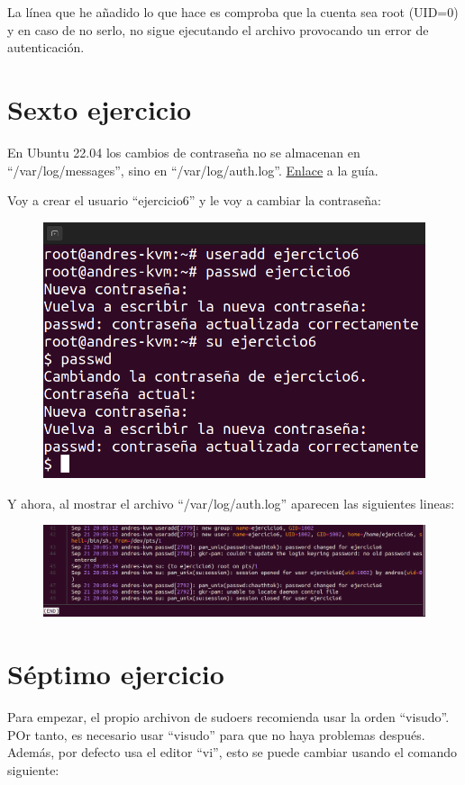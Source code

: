 \documentclass{article}
\begin{document}
La línea que he añadido lo que hace es comproba que la cuenta sea root (UID=0) y en caso de no serlo, no sigue ejecutando el archivo provocando un error de autenticación.


\section{Sexto ejercicio}
En Ubuntu 22.04 los cambios de contraseña no se almacenan en ``/var/log/messages'', sino en ``/var/log/auth.log''. \href{https://ubuntu.com/tutorials/viewing-and-monitoring-log-files#2-log-files-locations}{Enlace} a la guía.


Voy a crear el usuario ``ejercicio6'' y le voy a cambiar la contraseña:

\begin{figure}[H]
    \includegraphics[width=\textwidth]{imagenes/createejercicio6.png}
\end{figure}

Y ahora, al mostrar el archivo ``/var/log/auth.log'' aparecen las siguientes lineas:

\begin{figure}[H]
    \includegraphics[width=\textwidth]{imagenes/authcreateejercicio6.png}
\end{figure}

\section{Séptimo ejercicio}
Para empezar, el propio archivon de sudoers recomienda usar la orden ``visudo''. POr tanto, es necesario usar ``visudo'' para que no haya problemas después. Además, por defecto usa el editor ``vi'', esto se puede cambiar usando el comando siguiente:
\end{document}
